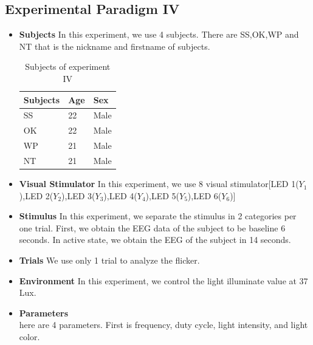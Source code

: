 \subsection{Experimental Paradigm IV}
\begin{itemize}
\item{\textbf{Subjects}}\newline
In this experiment, we use 4 subjects. There are SS,OK,WP and NT that is the nickname and firstname of subjects.


\begin{table}[ht]
\centering
\begin{tabular}{| P{.2\linewidth} | P{.2\linewidth} | P{.2\linewidth} |}
			\hline 
			\textbf{Subjects} & \textbf{Age}  & \textbf{Sex}\\
			\hline 
			SS & 22 & Male\\
			\hline 
			OK & 22 & Male\\
			\hline 
			WP & 21 & Male\\
			\hline 
			NT & 21 & Male\\
			\hline
		\end{tabular}       
\caption{Subjects of experiment IV}
\label{table:2}
\end{table}

\item{\textbf{Visual Stimulator}}
In this experiment, we use 8 visual stimulator[LED 1($Y_1$),LED 2($Y_2$),LED 3($Y_3$),LED 4($Y_4$),LED 5($Y_5$),LED 6($Y_6$)]
\item{\textbf{Stimulus}}
In this experiment, we separate the stimulus in 2 categories per one trial.
First, we obtain the EEG data of the subject to be baseline 6 seconds.
In active state, we obtain the EEG of the subject in 14 seconds.
\item{\textbf{Trials}}
We use only 1 trial to analyze the flicker.
\item{\textbf{Environment}}
In this experiment, we control the light illuminate value at 37 Lux.
\item{\textbf{Parameters}}\\
here are 4 parameters. First is frequency, duty cycle, light intensity, and light color.
\end{itemize}


